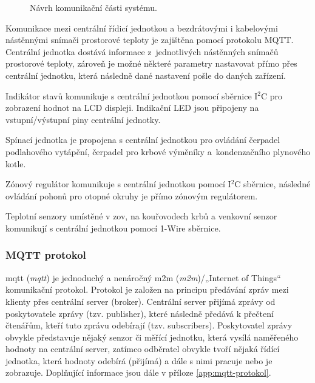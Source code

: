 \begin{figure}[H]
    \centering
    \def\svgwidth{\columnwidth}
    
    \caption{Návrh komunikační části systému.}
    \label{fig:navrh-softwarove-casti}
\end{figure}

Komunikace mezi centrální řídicí jednotkou a bezdrátovými i kabelovými nástěnnými snímači prostorové teploty je zajištěna pomocí protokolu MQTT. Centrální jednotka dostává informace z~jednotlivých nástěnných snímačů prostorové teploty, zároveň je možné některé parametry nastavovat přímo přes centrální jednotku, která následně dané nastavení pošle do daných zařízení.

Indikátor stavů komunikuje s centrální jednotkou pomocí sběrnice I$^2$C pro zobrazení hodnot na LCD displeji. Indikační LED jsou připojeny  na vstupní/výstupní piny centrální jednotky.

Spínací jednotka je propojena s centrální jednotkou pro ovládání čerpadel podlahového vytápění, čerpadel pro krbové výměníky a~kondenzačního plynového kotle.

Zónový regulátor komunikuje s centrální jednotkou pomocí I$^2$C sběrnice, následné ovládání pohonů pro otopné okruhy je přímo zónovým regulátorem.

Teplotní senzory umístěné v \acrshort{zov}, na kouřovodech krbů a venkovní senzor komunikují s centrální jednotkou pomocí 1-Wire sběrnice.



\subsubsection{MQTT protokol}
\label{sec:mqtt-protokol}

\acrshort{mqtt} \cite{mqtt-specifikace} (\textit{\acrlong{mqtt}}) je jednoduchý a nenáročný \acrshort{m2m} (\textit{\acrlong{m2m}})/„Internet of Things“ komunikační protokol. Protokol je založen na principu předávání zpráv mezi klienty přes centrální server (broker). Centrální server přijímá zprávy od poskytovatele zprávy (tzv. publisher), které následně předává k přečtení čtenářům, kteří tuto zprávu odebírají (tzv. subscribers). Poskytovatel zprávy obvykle představuje nějaký senzor či měřící jednotku, která vysílá naměřeného hodnoty na centrální server, zatímco odběratel obvykle tvoří nějaká řídící jednotka, která hodnoty odebírá (přijímá) a dále s nimi pracuje nebo je zobrazuje. \cite{vojacek-mqtt} Doplňující informace jsou dále v příloze \ref{app:mqtt-protokol}.

